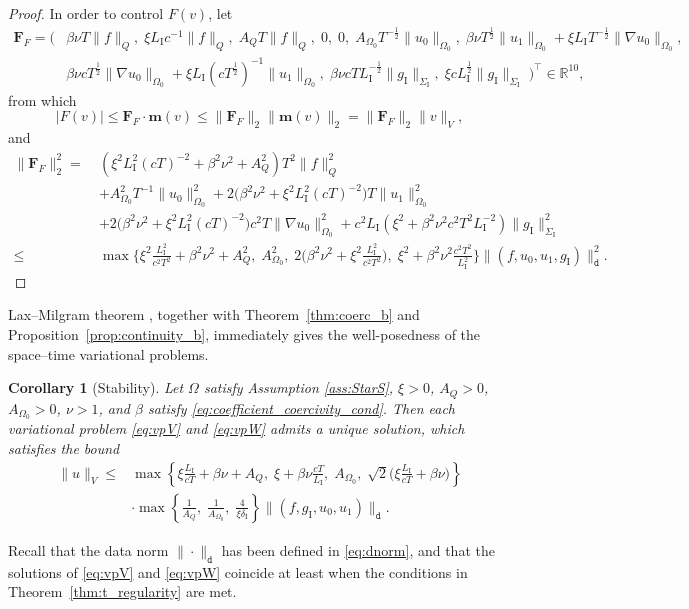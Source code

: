 \documentclass[a4paper]{article}
\theoremstyle{plain}
\newtheorem{corollary}[theorem]{Corollary}
\theoremstyle{definition}
\newcommand{\Grad}[1]{\nabla #1}
\newcommand{\vect}[1]{\bm{#1}}
\newcommand{\R}{\mathbb{R}}
\newcommand{\LI}{L_{\mathrm I}}
\newcommand{\deltaI}{{\delta_{\mathrm I}}}
\newcommand{\SI}{{\Sigma_{\mathrm I}}}
\newcommand{\gI}{{g_{\mathrm I}}}
\newcommand{\OZ}{{\Omega_0}}
\begin{document}
\begin{proof}
	In order to control $F(v)$, let
	\begin{align*}
		\vect F_F = \Big(
		 & \beta \nu T\|f\|_Q, \;
		\xi \LI c^{-1} \|f\|_Q, \;
		A_Q T \|f\|_Q, \;
		0, \;
		0, \;
		A_\OZ T^{-\frac12} \|u_0\|_\OZ, \;
		\beta\nu T^{\frac{1}{2}}  \|u_1\|_\OZ + \xi \LI T^{-\frac12}\|\Grad u_0\|_\OZ,             \\
		 & \beta \nu cT^{\frac{1}{2}} \|\Grad u_0\|_\OZ + \xi \LI(c T^\frac12)^{-1}\|u_1\|_\OZ, \;
		\beta \nu c T \LI^{-\frac{1}{2}} \|\gI\|_\SI, \;
		\xi c\LI^{\frac{1}{2}} \|\gI\|_\SI \;
		\Big)^\top\in\R^{10},
	\end{align*}
	from which
	\begin{equation*}
		|F(v)| \leq \vect F_F \cdot \vect m(v)
		\leq \|\vect F_F\|_2 \|\vect m(v)\|_2 =
		\|\vect F_F\|_2 \|v\|_V,
	\end{equation*}
	and
	\begin{align*}
		\|\vect F_F\|_2^2 = \  & \left(\xi^2 \LI^2(c T)^{-2} + \beta^2 \nu^2 + A_Q^2\right)T^2\|f\|_Q^2          \\
		                       & + A_\OZ^2 T^{-1} \|u_0\|_\OZ^2
		+ 2 \big(\beta^2 \nu^2 + \xi^2 \LI^2 (c T)^{-2}\big) T \|u_1\|_\OZ^2                                     \\
		                       & + 2 \big(\beta^2 \nu^2 + \xi^2 \LI^2 (c T)^{-2} \big) c^2 T \|\Grad u_0\|_\OZ^2
		+ c^2\LI\left(\xi^2 + \beta^2\nu^2 c^2T^2\LI^{-2}\right)  \|\gI\|_\SI^2
		\\
		\leq                   & \max\bigg\{
		\xi^2\frac{\LI^2}{c^2T^2} + \beta^2 \nu^2 + A_Q^2,\;
		A_\OZ^2, \;
		2 \Big(\beta^2 \nu^2 + \xi^2 \frac{\LI^2}{c^2T^2}\Big), \;
		\xi^2 + \beta^2 \nu^2 \frac{c^2T^2}{\LI^2}
		\bigg\} \|(f, u_0, u_1, \gI)\|_{\mathtt{d}}^2.
	\end{align*}
\end{proof}


Lax--Milgram theorem \cite[Thm.~2.7.7]{BrennerScottRidgway2008}, together with Theorem~\ref{thm:coerc_b} and Proposition~\ref{prop:continuity_b}, immediately gives the well-posedness of the space--time variational problems.
\begin{corollary}[Stability]
	Let $\Omega$ satisfy Assumption \ref{ass:StarS},
	$\xi>0$, $A_Q>0$, $A_\OZ>0$, $\nu>1$,
	and $\beta$ satisfy \eqref{eq:coefficient_coercivity_cond}.
	Then each variational problem \eqref{eq:vpV} and \eqref{eq:vpW} admits a unique solution, which satisfies the bound
	\begin{align*}
		\|u\|_V \leq
		 & \max\left\{
			\xi \frac{\LI}{c T}+ \beta \nu + A_Q,\;
			\xi + \beta \nu \frac{c T}{\LI},\;
			A_\OZ,\;
			\sqrt2 \Big(\xi\frac{\LI}{cT} + \beta \nu \Big)
	 \right\}  \\
		 & \cdot\max\left\{\frac1{A_Q},\;\frac1{A_\OZ},\; \frac4{\xi\deltaI}\right\}\|(f, \gI,u_0,u_1)\|_{\mathtt{d}}.
	\end{align*}
\end{corollary}
Recall that the data norm $\|\cdot\|_{\mathtt d}$ has been defined in \eqref{eq:dnorm}, and that the solutions of \eqref{eq:vpV} and \eqref{eq:vpW} coincide at least when the conditions in Theorem~\ref{thm:t_regularity} are met.
\end{document}
